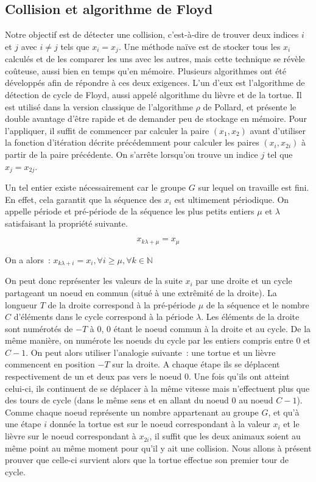         \subsection{Collision et algorithme de Floyd}
        Notre objectif est de détecter une collision, c'est-à-dire de trouver deux indices $i$ et $j$ avec $i \ne j$ tels que $x_i = x_j$. Une méthode naïve est de stocker tous les $x_i$ calculés et de les comparer les uns avec les autres, mais cette technique se révèle coûteuse, aussi bien en temps qu'en mémoire. Plusieurs algorithmes ont été développés afin de répondre à ces deux exigences. L'un d'eux est l'algorithme de détection de cycle de Floyd, aussi appelé algorithme du lièvre et de la tortue. Il est utilisé dans la version classique de l'algorithme \texorpdfstring{$\rho$}{Rho} de Pollard, et présente le double avantage d'être rapide et de demander peu de stockage en mémoire. Pour l'appliquer, il suffit de commencer par calculer la paire $(x_1, x_2)$ avant d'utiliser la fonction d'itération décrite précédemment pour calculer les paires $(x_i, x_{2i})$ à partir de la paire précédente. On s'arrête lorsqu'on trouve un indice $j$ tel que $x_j = x_{2j}$.

        Un tel entier existe nécessairement car le groupe $G$ sur lequel on travaille est fini. En effet, cela garantit que la séquence des $x_i$ est ultimement périodique. On appelle période et pré-période de la séquence les plus petits entiers $\mu$ et $\lambda$ satisfaisant la propriété suivante.

        \[ x_{k\lambda+\mu} = x_\mu \]

        On a alors~: $ x_{k\lambda+i} = x_i, \forall i \ge \mu, \forall k \in \mathbb{N}$

        On peut donc représenter les valeurs de la suite $x_i$ par une droite et un cycle partageant un noeud en commun (situé à une extrêmité de la droite). La longueur $T$ de la droite correspond à la pré-période $\mu$ de la séquence et le nombre $C$ d'éléments dans le cycle correspond à la période $\lambda$. Les éléments de la droite sont numérotés de $-T$ à $0$, $0$ étant le noeud commun à la droite et au cycle. De la même manière, on numérote les noeuds du cycle par les entiers compris entre $0$ et $C-1$. On peut alors utiliser l'analogie suivante~: une tortue et un lièvre commencent en position $-T$ sur la droite. A chaque étape ils se déplacent respectivement de un et deux pas vers le noeud $0$. Une fois qu'ils ont atteint celui-ci, ils continuent de se déplacer à la même vitesse mais n'effectuent plus que des tours de cycle (dans le même sens et en allant du noeud $0$ au noeud $C-1$). Comme chaque noeud représente un nombre appartenant au groupe $G$, et qu'à une étape $i$ donnée la tortue est sur le noeud correspondant à la valeur $x_i$ et le lièvre sur le noeud correspondant à $x_{2i}$, il suffit que les deux animaux soient au même point au même moment pour qu'il y ait une collision. Nous allons à présent prouver que celle-ci survient alors que la tortue effectue son premier tour de cycle.

